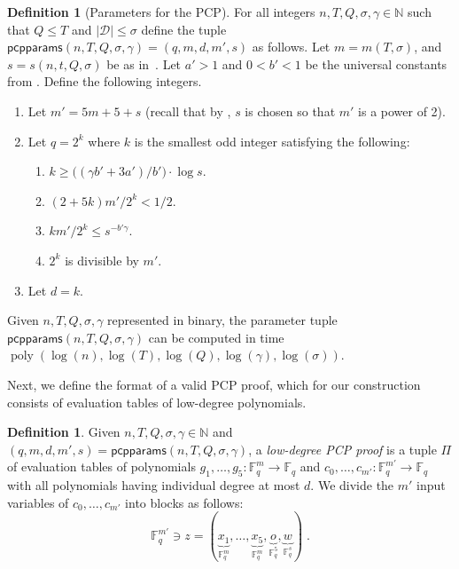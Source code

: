 \documentclass[11pt]{article}
\theoremstyle{definition}
\newtheorem{definition}[theorem]{Definition}
\newcommand{\N}{\ensuremath{\mathbb{N}}}
\newcommand{\F}{\ensuremath{\mathbb{F}}}
\DeclareMathOperator{\poly}{poly}
\newcommand{\decider}{\mathcal{D}}
\newcommand{\pcpparams}{\mathsf{pcpparams}}
\newcommand{\qlen}{Q}
\begin{document}
\begin{definition}[Parameters for the PCP]\label{def:pcpparams}
  For all integers $n, T, \qlen, \sigma, \gamma
  \in \N$ such that $\qlen \leq T$ and $|\decider|\leq \sigma$ define the tuple
  $\pcpparams(n,T,\qlen,\sigma,\gamma) = (q,m,d,m',s)$ as follows.
  Let $m=m(T,\sigma)$, and $s=s(n,t,Q,\sigma)$ be as
  in~.
  Let $a' > 1$ and $0 < b' < 1$ be the universal constants from
  .
  Define the following integers.
  \begin{enumerate}
	\item Let $m' = 5m + 5 + s$ (recall that by
          , $s$ is chosen
          so that $m'$ is a power of 2).
  \item Let $q = 2^k$ where $k$ is the smallest odd integer satisfying the following:
  \begin{enumerate}
  	\item $k \geq \Big ( (\gamma b' + 3a')/b' \Big ) \cdot \log s$.
	\item $(2 + 5k)m'/2^k < 1/2$.
	\item $km'/2^k \leq s^{-b' \gamma}$.
        \item $2^k$ is divisible by $m'$.
	\end{enumerate}
  \item Let $d = k$.

  \end{enumerate}
  Given $n, T, \qlen,\sigma,\gamma$ represented in binary, the parameter tuple
  $\pcpparams(n, T, \qlen, \sigma, \gamma)$ can be computed in time
  $\poly(\log(n), \log(T), \log(\qlen), \log (\gamma), \log(\sigma))$.
\end{definition}



Next, we define the format of a valid PCP proof, which for our construction
consists of evaluation tables of low-degree polynomials.

\begin{definition}\label{def:pcp-proof}
  Given $n, T, \qlen, \sigma, \gamma \in \N$ and $(q,m,d,m',s)=
  \pcpparams(n, T, \qlen, \sigma,\gamma)$, a \emph{low-degree PCP proof} is a tuple
  $\Pi$ of evaluation tables of polynomials $g_1, \dots, g_5: \F_q^{m} \to \F_q$
  and $c_0, \dots, c_{m'}: \F_q^{m'} \to \F_q$ with all polynomials having
  individual degree at most $d$.
  We divide the $m'$ input variables of $c_0, \dots, c_{m'}$ into blocks as
  follows:
  \[
    \F_q^{m'} \ni z = (\underbrace{x_1}_{\F_q^m}, \dots,
    \underbrace{x_5}_{\F_q^m}, \underbrace{o}_{\F_q^5},
    \underbrace{w}_{\F_q^s})\;.
  \]
\end{definition}
\end{document}
